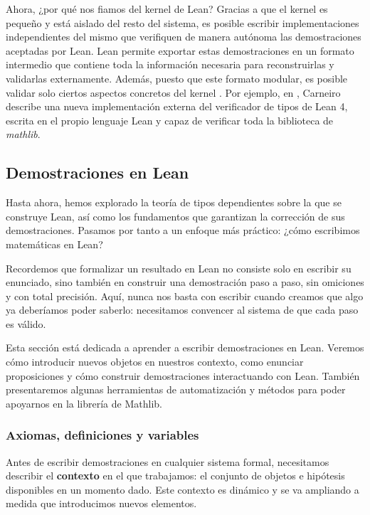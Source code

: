 Ahora, ¿por qué nos fiamos del kernel de Lean? Gracias a que el kernel es pequeño y está aislado del resto del sistema, es posible escribir implementaciones independientes del mismo que verifiquen de manera autónoma las demostraciones aceptadas por Lean. Lean permite exportar estas demostraciones en un formato intermedio que contiene toda la información necesaria para reconstruirlas y validarlas externamente. Además, puesto que este formato modular, es posible validar solo ciertos aspectos concretos del kernel \cite{bailey2024type}. Por ejemplo, en \cite{carneiro2024lean4lean}, Carneiro describe una nueva implementación externa del verificador de tipos de Lean 4, escrita en el propio lenguaje Lean y capaz de verificar toda la biblioteca de \textit{mathlib}.



\subsection{Demostraciones en Lean}

Hasta ahora, hemos explorado la teoría de tipos dependientes sobre la que se construye Lean, así como los fundamentos que garantizan la corrección de sus demostraciones. Pasamos por tanto a un enfoque más práctico: ¿cómo escribimos matemáticas en Lean?

Recordemos que formalizar un resultado en Lean no consiste solo en escribir su enunciado, sino también en construir una demostración paso a paso, sin omiciones y con total precisión. Aquí, nunca nos basta con escribir  cuando creamos que algo ya deberíamos poder saberlo: necesitamos convencer al sistema de que cada paso es válido.

Esta sección está dedicada a aprender a escribir demostraciones en Lean. Veremos cómo introducir nuevos objetos en nuestros contexto, como enunciar proposiciones y cómo construir demostraciones interactuando con Lean. También presentaremos algunas herramientas de automatización y métodos para poder apoyarnos en la librería de Mathlib.

\subsubsection{Axiomas, definiciones y variables}

Antes de escribir demostraciones en cualquier sistema formal, necesitamos describir el \textbf{contexto} en el que trabajamos: el conjunto de objetos e hipótesis disponibles en un momento dado. Este contexto es dinámico y se va ampliando a medida que introducimos nuevos elementos.

